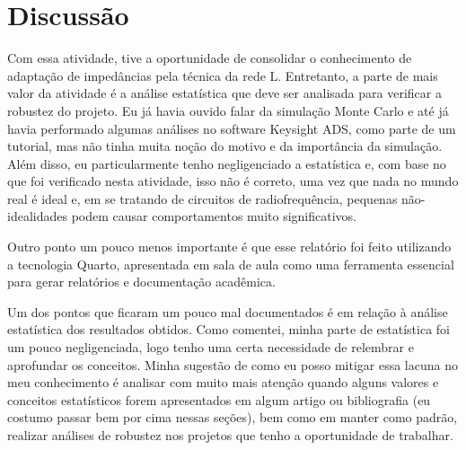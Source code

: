 \documentclass[
  number,
  preprint]{elsarticle}
\begin{document}
\section{Discussão}\label{discussuxe3o}

Com essa atividade, tive a oportunidade de consolidar o conhecimento de
adaptação de impedâncias pela técnica da rede L. Entretanto, a parte de
mais valor da atividade é a análise estatística que deve ser analisada
para verificar a robustez do projeto. Eu já havia ouvido falar da
simulação Monte Carlo e até já havia performado algumas análises no
software Keysight ADS, como parte de um tutorial, mas não tinha muita
noção do motivo e da importância da simulação. Além disso, eu
particularmente tenho negligenciado a estatística e, com base no que foi
verificado nesta atividade, isso não é correto, uma vez que nada no
mundo real é ideal e, em se tratando de circuitos de radiofrequência,
pequenas não-idealidades podem causar comportamentos muito
significativos.

Outro ponto um pouco menos importante é que esse relatório foi feito
utilizando a tecnologia Quarto, apresentada em sala de aula como uma
ferramenta essencial para gerar relatórios e documentação acadêmica.

Um dos pontos que ficaram um pouco mal documentados é em relação à
análise estatística dos resultados obtidos. Como comentei, minha parte
de estatística foi um pouco negligenciada, logo tenho uma certa
necessidade de relembrar e aprofundar os conceitos. Minha sugestão de
como eu posso mitigar essa lacuna no meu conhecimento é analisar com
muito mais atenção quando alguns valores e conceitos estatísticos forem
apresentados em algum artigo ou bibliografia (eu costumo passar bem por
cima nessas seções), bem como em manter como padrão, realizar análises
de robustez nos projetos que tenho a oportunidade de trabalhar.


\renewcommand\refname{References}
  
\end{document}
